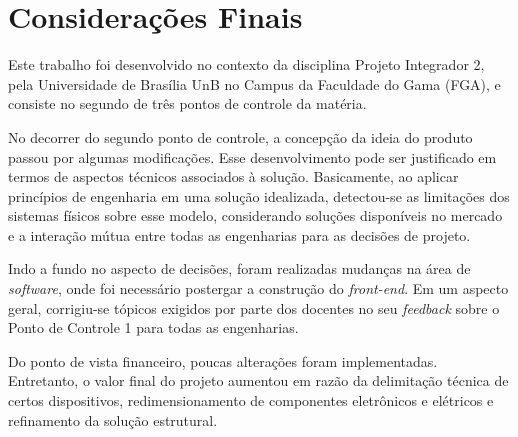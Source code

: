\chapter[Considerações Finais]{Considerações Finais}

Este trabalho foi desenvolvido no contexto da disciplina Projeto Integrador 2,
pela Universidade de Brasília UnB no Campus da Faculdade do Gama (FGA), e consiste no
segundo de três pontos de controle da matéria. 


No decorrer do segundo ponto de controle, a concepção da ideia do produto passou por algumas modificações. Esse desenvolvimento pode ser justificado em termos de aspectos técnicos associados à solução. Basicamente, ao aplicar princípios de engenharia em uma solução idealizada, detectou-se as limitações dos sistemas físicos sobre esse modelo, considerando soluções disponíveis no mercado e a interação mútua entre todas as engenharias para as decisões de projeto.

Indo a fundo no aspecto de decisões, foram realizadas mudanças na área de \textit{software}, onde foi necessário postergar a construção do \textit{front-end}. Em um aspecto geral, corrigiu-se tópicos exigidos por parte dos docentes no seu \textit{feedback} sobre o Ponto de Controle 1 para todas as engenharias.

Do ponto de vista financeiro, poucas alterações foram implementadas. Entretanto, o valor final do projeto aumentou em razão da delimitação técnica de certos dispositivos, 
redimensionamento de componentes eletrônicos e elétricos e refinamento da solução estrutural.

